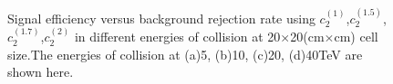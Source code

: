 \begin{figure}
\begin{center}

\end{center}
\caption{Signal efficiency versus background rejection rate using $c_2^{(1)}$,$c_2^{(1.5)}$,$c_2^{(1.7)}$,$c_2^{(2)}$ in different energies of collision at 20$\times$20(cm$\times$cm) cell size.The energies of collision at (a)5, (b)10, (c)20, (d)40TeV are shown here.}
\label{fig:cluster_r010_c_variable}
\end{figure}

